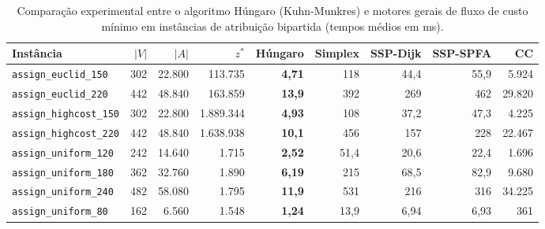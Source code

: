 \begin{table}[!ht]
\centering
\small
\setlength{\tabcolsep}{3.5pt}
\begin{tabular}{lrrrrrrrr}
\toprule
\textbf{Instância} & $|V|$ & $|A|$ & $z^*$ & \textbf{Húngaro} & \textbf{Simplex} & \textbf{SSP-Dijk} & \textbf{SSP-SPFA} & \textbf{CC} \\
\midrule
\texttt{assign\_euclid\_150} & 302 & 22.800 & 113.735 & \textbf{4,71} & 118 & 44,4 & 55,9 & 5.924 \\
\texttt{assign\_euclid\_220} & 442 & 48.840 & 163.859 & \textbf{13,9} & 392 & 269 & 462 & 29.820 \\
\texttt{assign\_highcost\_150} & 302 & 22.800 & 1.889.344 & \textbf{4,93} & 108 & 37,2 & 47,3 & 4.225 \\
\texttt{assign\_highcost\_220} & 442 & 48.840 & 1.638.938 & \textbf{10,1} & 456 & 157 & 228 & 22.467 \\
\texttt{assign\_uniform\_120} & 242 & 14.640 & 1.715 & \textbf{2,52} & 51,4 & 20,6 & 22,4 & 1.696 \\
\texttt{assign\_uniform\_180} & 362 & 32.760 & 1.890 & \textbf{6,19} & 215 & 68,5 & 82,9 & 9.680 \\
\texttt{assign\_uniform\_240} & 482 & 58.080 & 1.795 & \textbf{11,9} & 531 & 216 & 316 & 34.225 \\
\texttt{assign\_uniform\_80} & 162 & 6.560 & 1.548 & \textbf{1,24} & 13,9 & 6,94 & 6,93 & 361 \\
\bottomrule
\end{tabular}
\caption{Comparação experimental entre o algoritmo Húngaro (Kuhn-Munkres) e motores gerais de fluxo de custo mínimo em instâncias de atribuição bipartida (tempos médios em ms).}
\label{tab:benchmarks_bipartite_assignment}
\end{table}
